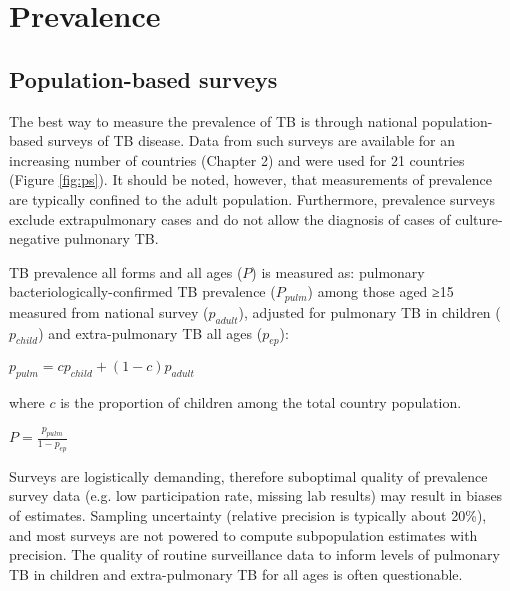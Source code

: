 \section{Prevalence}

\subsection{Population-based surveys}
The best way to measure the prevalence of TB is through national population-based surveys of TB disease\cite{18713496}\cite{WHO2011}. Data from such surveys are available for an increasing number of countries (Chapter 2) and were used for 21 countries (Figure \ref{fig:ps}). It should be noted, however, that measurements of prevalence are typically confined to the adult population. Furthermore, prevalence surveys exclude extrapulmonary cases and do not allow the diagnosis of cases of culture-negative pulmonary TB. 

TB prevalence all forms and all ages ($P$) is measured as: pulmonary bacteriologically-confirmed TB prevalence ($P_{pulm}$) among those aged ≥15 measured from national survey ($p_{adult}$), adjusted for pulmonary TB in children ($p_{child}$) and extra-pulmonary TB all ages ($p_{ep}$):

$p_{pulm} = c p_{child} + (1 − c) p_{adult}$

where $c$ is the proportion of children among the total country population.

$P = \frac{p_{pulm}}{1 - p_{ep}}$

Surveys are logistically demanding, therefore suboptimal quality of prevalence survey data (e.g. low participation rate, missing lab results) may result in biases of estimates. Sampling uncertainty (relative precision is typically about 20\%), and most surveys are not powered to compute subpopulation estimates with precision. The  quality of routine surveillance data to inform levels of pulmonary TB in children and extra-pulmonary TB for all ages is often questionable.



 
